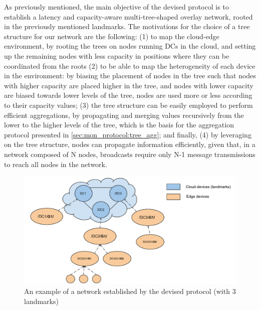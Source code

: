 As previously mentioned, the main objective of the devised protocol is to establish a latency and capacity-aware multi-tree-shaped overlay network, rooted in the previously mentioned landmarks. The motivations for the choice of a tree structure for our network are the following: (1) to map the cloud-edge environment, by rooting the trees on nodes running DCs in the cloud, and setting up the remaining nodes with less capacity in positions where they can be coordinated from the roots (2) to be able to map the heterogeneity of each device in the environment: by biasing the placement of nodes in the tree such that nodes with higher capacity are placed higher in the tree, and nodes with lower capacity are biased towards lower levels of the tree, nodes are used more or less according to their capacity values; (3) the tree structure can be easily employed to perform efficient aggregations, by propagating and merging values recursively from the lower to the higher levels of the tree, which is the basis for the aggregation protocol presented in \ref{sec:mon_protocol:tree_agg}; and finally, (4) by leveraging on the tree structure, nodes can propagate information efficiently, given that, in a network composed of N nodes, broadcasts require only N-1 message transmissions to reach all nodes in the network. 

\begin{figure}[htbp]
    \centering
    \includegraphics[width=\textwidth]{Chapters/membership/images/DeMMon-overlay-structure.pdf}
    \caption{An example of a network established by the devised protocol (with 3 landmarks)}
    \label{fig:demmon-membership-structure}
\end{figure}


